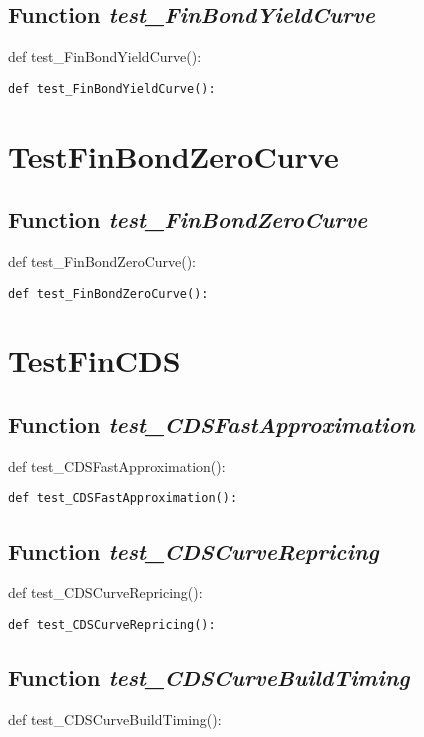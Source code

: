 \documentclass[twoside,11pt]{book}
\begin{document}
\subsection{Function {\it test\_FinBondYieldCurve}}
def test\_FinBondYieldCurve():

\begin{lstlisting}
def test_FinBondYieldCurve():
\end{lstlisting}


\newpage
\section{TestFinBondZeroCurve}

\subsection{Function {\it test\_FinBondZeroCurve}}
def test\_FinBondZeroCurve():

\begin{lstlisting}
def test_FinBondZeroCurve():
\end{lstlisting}


\newpage
\section{TestFinCDS}

\subsection{Function {\it test\_CDSFastApproximation}}
def test\_CDSFastApproximation():

\begin{lstlisting}
def test_CDSFastApproximation():
\end{lstlisting}

\subsection{Function {\it test\_CDSCurveRepricing}}
def test\_CDSCurveRepricing():

\begin{lstlisting}
def test_CDSCurveRepricing():
\end{lstlisting}

\subsection{Function {\it test\_CDSCurveBuildTiming}}
def test\_CDSCurveBuildTiming():
\end{document}
